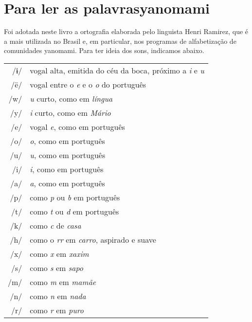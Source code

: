 \chapter[Para ler as palavras yanomami]{Para ler as palavras\break yanomami}


Foi adotada neste livro a ortografia elaborada pelo linguista Henri Ramirez, que é a mais utilizada no Brasil e, em particular, nos programas de alfabetização de comunidades yanomami. Para ter ideia dos sons, indicamos abaixo.

\bigskip

\begingroup%
\begin{tabular}{rl}
/ɨ/ & vogal alta, emitida do céu da boca, próximo a \textit{i} e \textit{u}\\
/ë/ & vogal entre o \textit{e} e o \textit{o} do português\\
/w/ & \textit{u} curto, como em \textit{língua}\\
/y/ & \textit{i} curto, como em \textit{Mário}\\
/e/ & vogal \textit{e}, como em português\\
/o/ & \textit{o}, como em português\\
/u/ & \textit{u}, como em português\\
/i/ & \textit{i}, como em português\\
/a/ & \textit{a}, como em português\\
/p/ & como \textit{p} ou \textit{b} em português\\
/t/ & como \textit{t} ou \textit{d} em português\\
/k/ & como \textit{c} de \textit{casa}\\
/h/ & como o \textit{rr} em \textit{carro}, aspirado e suave\\
/x/ & como \textit{x} em \textit{xaxim}\\
/s/ & como \textit{s} em \textit{sapo}\\
/m/ & como \textit{m} em \textit{mamãe}\\
/n/ & como \textit{n} em \textit{nada}\\
/r/ & como \textit{r} em \textit{puro}\\
\end{tabular}
\endgroup